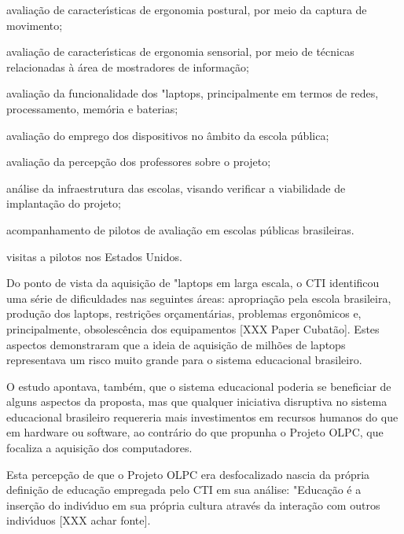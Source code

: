 \documentclass[
12pt,		%
openright,	%
twoside,  %
a4paper,			%
chapter=TITLE,		%
english,			%
french,				%
spanish,			%
brazil				%
]{USPSC-classe/USPSC}
\begin{document}
\begin{alineas}
\item avalia\c{c}\~ao de caracter\'{\i}sticas de ergonomia postural, por meio da captura de movimento;
\item avalia\c{c}\~ao de caracter\'{\i}sticas de ergonomia sensorial, por meio de t\'ecnicas relacionadas \`a \'area de mostradores de informa\c{c}\~ao;
\item avalia\c{c}\~ao da funcionalidade dos "laptops, principalmente em termos de redes, processamento, mem\'oria e baterias;
\item avalia\c{c}\~ao do emprego dos dispositivos no \^ambito da escola p\'ublica;
\item avalia\c{c}\~ao da percep\c{c}\~ao dos professores sobre o projeto;
\item an\'alise da infraestrutura das escolas, visando verificar a viabilidade de implanta\c{c}\~ao do projeto;
\item acompanhamento de pilotos de avalia\c{c}\~ao em escolas p\'ublicas brasileiras.
\item visitas a pilotos nos Estados Unidos.
\end{alineas}

Do ponto de vista da aquisi\c{c}\~ao de "laptops em larga escala, o CTI identificou uma s\'erie de dificuldades nas seguintes \'areas: apropria\c{c}\~ao pela escola brasileira, produ\c{c}\~ao dos laptops, restri\c{c}\~oes or\c{c}ament\'arias, problemas ergon\^omicos e, principalmente, obsolesc\^encia dos equipamentos [XXX Paper Cubat\~ao]. Estes aspectos demonstraram que a ideia de aquisi\c{c}\~ao de milh\~oes de laptops representava um risco muito grande para o sistema educacional brasileiro.




O estudo apontava, tamb\'em, que o sistema educacional poderia se beneficiar de alguns aspectos da proposta, mas que qualquer iniciativa disruptiva no sistema educacional brasileiro requereria mais investimentos em recursos humanos do que em hardware ou software, ao contr\'ario do que propunha o Projeto OLPC, que focaliza a aquisi\c{c}\~ao dos computadores. 




Esta percep\c{c}\~ao de que o Projeto OLPC era desfocalizado nascia da pr\'opria defini\c{c}\~ao de educa\c{c}\~ao empregada pelo CTI em sua an\'alise: "Educa\c{c}\~ao \'e a inser\c{c}\~ao do indiv\'{\i}duo em sua pr\'opria cultura atrav\'es da intera\c{c}\~ao com outros indiv\'{\i}duos [XXX achar fonte].
\end{document}
